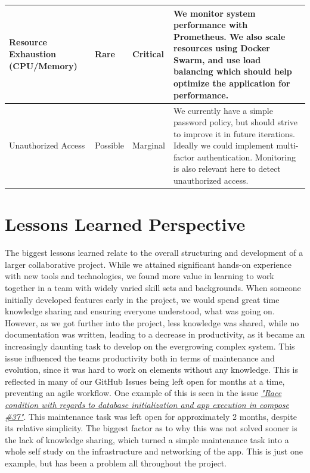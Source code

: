 \documentclass[11pt]{article}
\begin{document}
\begin{table}[H]
\begin{tabular}{|p{3cm}|p{2cm}|p{2cm}|p{7cm}|}
        \hline
        Resource Exhaustion (CPU/Memory) & Rare & Critical & We monitor system performance with Prometheus. We also scale resources using Docker Swarm, and use load balancing which should help optimize the application for performance. \\
        \hline
        Unauthorized Access & Possible & Marginal & We currently have a simple password policy, but should strive to improve it in future iterations. Ideally we could implement multi-factor authentication. Monitoring is also relevant here to detect unauthorized access.  \\
        \hline
    \end{tabular}
    \label{tab:risk-assessment}
\end{table}

\section{Lessons Learned Perspective}
The biggest lessons learned relate to the overall structuring and development of a larger collaborative project. While we attained significant hands-on experience with new tools and technologies, we found more value in learning to work together in a team with widely varied skill sets and backgrounds. When someone initially developed features early in the project, we would spend great time knowledge sharing and ensuring everyone understood, what was going on. However, as we got further into the project, less knowledge was shared, while no documentation was written, leading to a decrease in productivity, as it became an increasingly daunting task to develop on the evergrowing complex system. This issue influenced the teams productivity both in terms of maintenance and evolution, since it was hard to work on elements without any knowledge. This is reflected in many of our GitHub Issues being left open for months at a time, preventing an agile workflow. One example of this is seen in the issue \href{https://github.com/group-o-minitwit-2024/MiniTwit/issues/37}{\textit{"Race condition with regards to database initialization and app execution in compose \#37"}}. This maintenance task was left open for approximately 2 months, despite its relative simplicity. The biggest factor as to why this was not solved sooner is the lack of knowledge sharing, which turned a simple maintenance task into a whole self study on the infrastructure and networking of the app. This is just one example, but has been a problem all throughout the project. \\
\end{document}

